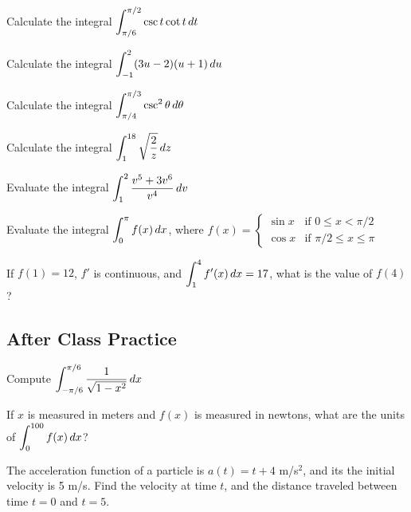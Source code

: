 \documentclass[notes]{subfiles}
\begin{document}
		\begin{ex}
			Calculate the integral \(\displaystyle \int_{\pi/6}^{\pi/2}\csc t\cot t\, dt\)
		\end{ex}
			
		\begin{ex}
			Calculate the integral \(\displaystyle \int_{-1}^2 (3u-2)(u+1)\, du\)
		\end{ex}
			
		\begin{ex}
			Calculate the integral \(\displaystyle \int_{\pi/4}^{\pi/3} \csc^2\theta\, d\theta\)
		\end{ex}
			\newpage
			
		\begin{ex}
			Calculate the integral \(\displaystyle \int_1^{18} \sqrt{\dfrac{2}{z}}\, dz\)
		\end{ex}
			
		\begin{ex}	
			Evaluate the integral \(\displaystyle \int_1^2 \dfrac{v^5+3v^6}{v^4}\, dv\)
		\end{ex}
			
		\begin{ex}
			Evaluate the integral \(\displaystyle\int_0^\pi f(x)\, dx\), where \(f(x) = \begin{cases}\sin x & \text{if }0\leq x < \pi/2 \\ \cos x & \text{if }\pi/2\leq x\leq \pi \end{cases}\)
		\end{ex}
			
		\begin{ex}
			If \(f(1) = 12\), \(f'\) is continuous, and \(\displaystyle \int_1^4 f'(x)\, dx = 17\), what is the value of \(f(4)\)?
		\end{ex}	
			\newpage
	
	\subsection*{After Class Practice}
		\begin{ex}
			Compute \(\displaystyle \int_{-\pi/6}^{\pi/6} \dfrac{1}{\sqrt{1-x^2}}\, dx\)
		\end{ex}
			
		\begin{ex}
			If \(x\) is measured in meters and \(f(x)\) is measured in newtons, what are the units of \(\displaystyle \int_0^{100}f(x)\,dx\)?
		\end{ex}
			
		\begin{ex}
			The acceleration function of a particle is \(a(t) = t+4\) m/s\(^2\), and its the initial velocity is 5 m/s.  Find the velocity at time \(t\), and the distance traveled between time \(t = 0\) and \(t = 5\).
		\end{ex}
			\newpage
			
\end{document}
